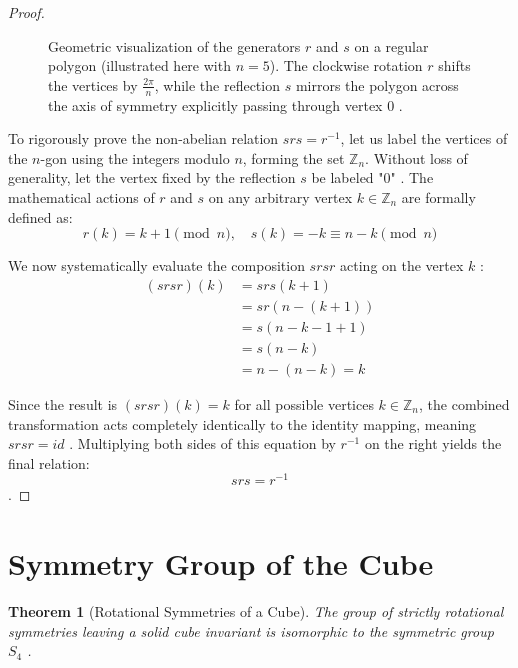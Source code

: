 \documentclass[11pt]{article}
\theoremstyle{definition}
\theoremstyle{plain}
\newtheorem{theorem}{Theorem}[section]
\theoremstyle{remark}
\begin{document}
\begin{proof}
\begin{figure}[H]
\begin{tikzpicture}[scale=1.5, thick, >=stealth]
    \end{tikzpicture}
    \caption{Geometric visualization of the generators $r$ and $s$ on a regular polygon (illustrated here with $n=5$). The clockwise rotation $r$ shifts the vertices by $\frac{2\pi}{n}$, while the reflection $s$ mirrors the polygon across the axis of symmetry explicitly passing through vertex $0$ \cite{gallian}.}
    \label{fig:Dn_generators_combined}
\end{figure}

To rigorously prove the non-abelian relation $srs = r^{-1}$, let us label the vertices of the $n$-gon using the integers modulo $n$, forming the set $\mathbb{Z}_n$. Without loss of generality, let the vertex fixed by the reflection $s$ be labeled "$0$" \cite{gallian}. 
The mathematical actions of $r$ and $s$ on any arbitrary vertex $k \in \mathbb{Z}_n$ are formally defined as:
\begin{equation}
    r(k) = k + 1 \pmod n, \quad s(k) = -k \equiv n - k \pmod n
\end{equation}

We now systematically evaluate the composition $srsr$ acting on the vertex $k$ \cite{dummit}:
\begin{align}
    (srsr)(k) &= srs(k+1) \\
    &= sr(n - (k+1)) \\
    &= s(n - k - 1 + 1) \\
    &= s(n - k) \\
    &= n - (n - k) = k
\end{align}

Since the result is $(srsr)(k) = k$ for all possible vertices $k \in \mathbb{Z}_n$, the combined transformation acts completely identically to the identity mapping, meaning $srsr = id$ \cite{fraleigh}. Multiplying both sides of this equation by $r^{-1}$ on the right yields the final relation:
\begin{equation}
    srs = r^{-1}
\end{equation}
\cite{dummit}.
\end{proof}



\section{Symmetry Group of the Cube}

\begin{theorem}[Rotational Symmetries of a Cube]
The group of strictly rotational symmetries leaving a solid cube invariant is isomorphic to the symmetric group $S_4$ \cite{dummit}.
\end{theorem}
\end{document}

